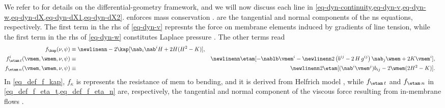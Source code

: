We refer to \cite{desernoFluidLipidMembranes2015,worthmullerIRENEFluIdLayeR2025,marchiafavaAppuntiDiGeometria2005,arroyoRelaxationDynamicsFluid2009i} for details on the differential-geometry framework, and we will now discuss each line in \cref{eq-dyn-continuity,eq-dyn-v,eq-dyn-w,eq-dyn-dX,eq-dyn-dX1,eq-dyn-dX2}.
 enforces mass conservation \cite{landauFluidMechanics1987}.
 are the tangential and normal components of the \ac{ns} equations, respectively.
The first term in the \ac{rhs} of \cref{eq-dyn-v} represnts the force on membrane elements induced by gradients of line tension, while the first term in the \ac{rhs} of \cref{eq-dyn-w} constitutes Laplace pressure \cite{degennesCapillarityWettingPhenomena2004}. The other terms read
\begin{align}
    \label{eq_def_f_kap}
    f_\kap (\nu, \psi)                                                                                                       & \equiv                                                                                                  \newlinenn
    -2\kap [ \nab_i \nab^i H + 2 H (H^2-K)],                                                                                 &                                                                                                                                 \\
    \label{eq_def_f_eta_t}
    f_{\etam\, t}^i(\vmem, \wmem,
    \nu, \psi)                                                                                                               & \equiv                                                                                                             & \newlinenn
    \etam [ - \nablb \vmem^i - \newlinenn
    2 \left( b^{ij} - 2 \, H \, g^{ij}  \right) \nab_j \wmem + 2 K \vmem^i  ]                                                & ,                                                                                                                  &            \\
    \label{eq_def_f_eta_n}
    f_{\etam\, n}      (\vmem, \wmem, \nu, \psi)                                                                             & \equiv                                                                                                             & \newlinenn
    2 \etam [ (\nab^i \vmem^j)b_{ij} - 2 \wmem (2 H^2 - K)                                                                 ] & .
\end{align}
In \cref{eq_def_f_kap}, $f_\kappa$ is represents the resistance of \ac{mem} to bending, and it is derived from Helfrich model \cite{helfrichElasticPropertiesLipid1973}, while $f_{\etam\, t}$ and $f_{\etam\, n}$ in \cref{eq_def_f_eta_t,eq_def_f_eta_n} are, respectively, the tangential and normal component of the viscous force resulting from in-membrane flows \cite{arroyoRelaxationDynamicsFluid2009i}.
